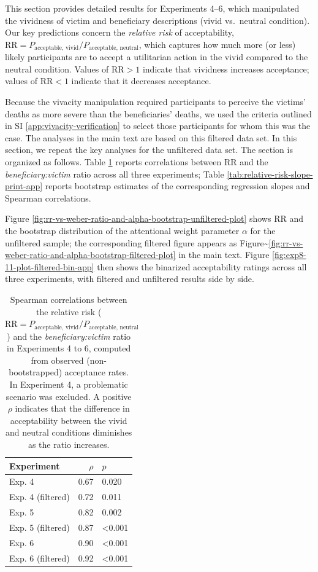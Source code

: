 \documentclass[
]{article}
\begin{document}
This section provides detailed results for Experiments 4--6, which manipulated the vividness of victim and beneficiary descriptions (vivid vs.~neutral condition). Our key predictions concern the \textit{relative risk} of acceptability, \(\mathrm{RR}= P_{\text{acceptable, vivid}} / P_{\text{acceptable, neutral}}\), which captures how much more (or less) likely participants are to accept a utilitarian action in the vivid compared to the neutral condition. Values of \(\mathrm{RR}> 1\) indicate that vividness increases acceptance; values of \(\mathrm{RR}< 1\) indicate that it decreases acceptance.

Because the vivacity manipulation required participants to perceive the victims' deaths as more severe than the beneficiaries' deaths, we used the criteria outlined in SI \ref{app:vivacity-verification} to select those participants for whom this was the case. The analyses in the main text are based on this filtered data set. In this section, we repeat the key analyses for the unfiltered data set.
The section is organized as follows. Table \ref{tab:create-rr-correlations-no-bootstrap-app} reports correlations between \(\mathrm{RR}\) and the \textit{beneficiary:victim} ratio across all three experiments; Table \ref{tab:relative-risk-slope-print-app} reports bootstrap estimates of the corresponding regression slopes and Spearman correlations.

Figure \ref{fig:rr-vs-weber-ratio-and-alpha-bootstrap-unfiltered-plot} shows \(\mathrm{RR}\) and the bootstrap distribution of the attentional weight parameter \(\alpha\) for the unfiltered sample; the corresponding filtered figure appears as Figure\textasciitilde{}\ref{fig:rr-vs-weber-ratio-and-alpha-bootstrap-filtered-plot} in the main text. Figure \ref{fig:exp8-11-plot-filtered-bin-app} then shows the binarized acceptability ratings across all three experiments, with filtered and unfiltered results side by side.

\begin{table}
\centering
\caption{\label{tab:create-rr-correlations-no-bootstrap-app}Spearman correlations between the relative risk ($\mathrm{RR}= P_{\text{acceptable, vivid}} / P_{\text{acceptable, neutral}}$) and the \textit{beneficiary:victim} ratio in Experiments 4 to 6, computed from observed (non-bootstrapped) acceptance rates. In Experiment 4, a problematic scenario was excluded. A positive $\rho$ indicates that the difference in acceptability between the vivid and neutral conditions diminishes as the ratio increases.}
\centering
\begin{tabular}[t]{lrl}
\toprule
Experiment & $\rho$ & $p$\\
\midrule
Exp. 4 & 0.67 & 0.020\\
Exp. 4 (filtered) & 0.72 & 0.011\\
Exp. 5 & 0.82 & 0.002\\
Exp. 5 (filtered) & 0.87 & <0.001\\
Exp. 6 & 0.90 & <0.001\\
\addlinespace
Exp. 6 (filtered) & 0.92 & <0.001\\
\bottomrule
\end{tabular}
\end{table}
\end{document}
